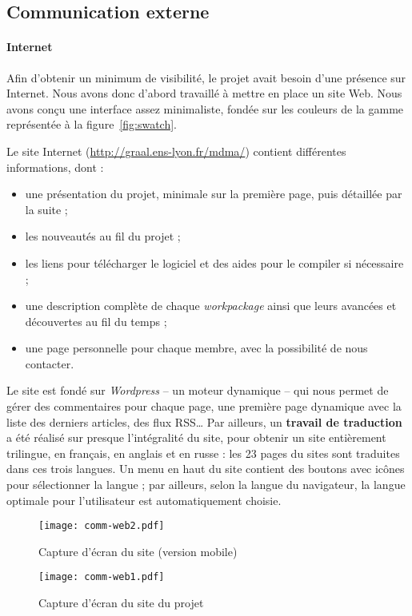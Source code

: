 \subsection{Communication externe}
\paragraph{Internet}
\par Afin d'obtenir un minimum de visibilité, le projet avait besoin d'une présence sur Internet. Nous avons donc d'abord travaillé à mettre en place un site Web. Nous avons conçu une interface assez minimaliste, fondée sur les couleurs de la gamme représentée à la figure~\ref{fig:swatch}.
\par Le site Internet (\url{http://graal.ens-lyon.fr/mdma/}) contient différentes informations, dont :
\begin{itemize}
  \item une présentation du projet, minimale sur la première page, puis détaillée par la suite ;
  \item les nouveautés au fil du projet ;
  \item les liens pour télécharger le logiciel et des aides pour le compiler si nécessaire ;
  \item une description complète de chaque \emph{workpackage} ainsi que leurs avancées et découvertes au fil du temps ;
  \item une page personnelle pour chaque membre, avec la possibilité de nous contacter.
\end{itemize}
\par Le site est fondé sur \emph{Wordpress} -- un moteur dynamique -- qui nous permet de gérer des commentaires pour chaque page, une première page dynamique avec la liste des derniers articles, des flux RSS… Par ailleurs, un \textbf{travail de traduction} a été réalisé sur presque l'intégralité du site, pour obtenir un site entièrement trilingue, en français, en anglais et en russe : les 23 pages du sites sont traduites dans ces trois langues. Un menu en haut du site contient des boutons avec icônes pour sélectionner la langue ; par ailleurs, selon la langue du navigateur, la langue optimale pour l'utilisateur est automatiquement choisie.
\begin{figure}[p]
  \centering
    \texttt{[image: comm-web2.pdf]}
  \caption{Capture d'écran du site (version mobile)}
\end{figure}
\begin{figure}[p]
  \centering
    \texttt{[image: comm-web1.pdf]}
  \caption{Capture d'écran du site du projet}
\end{figure}
